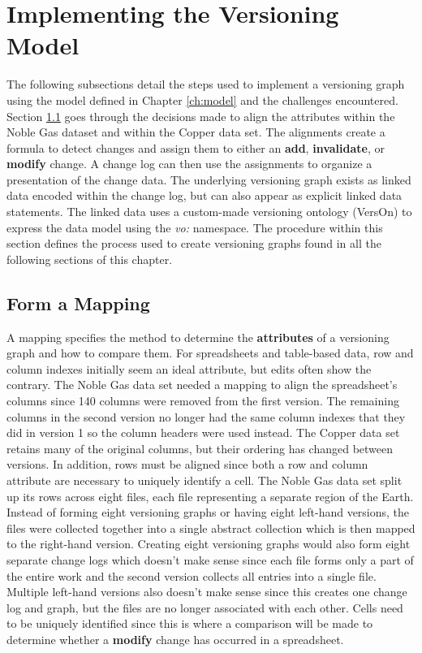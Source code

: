 \section{Implementing the Versioning Model}

The following subsections detail the steps used to implement a versioning graph using the model defined in Chapter \ref{ch:model} and the challenges encountered.
Section \ref{mapping} goes through the decisions made to align the attributes within the Noble Gas dataset and within the Copper data set.
The alignments create a formula to detect changes and assign them to either an \textbf{add}, \textbf{invalidate}, or \textbf{modify} change.
A change log can then use the assignments to organize a presentation of the change data.
The underlying versioning graph exists as linked data encoded within the change log, but can also appear as explicit linked data statements.
The linked data uses a custom-made versioning ontology (VersOn) to express the data model using the \textit{vo:} namespace.
The procedure within this section defines the process used to create versioning graphs found in all the following sections of this chapter.

\subsection{Form a Mapping} \label{mapping}

A mapping specifies the method to determine the \textbf{attributes} of a versioning graph and how to compare them.
For spreadsheets and table-based data, row and column indexes initially seem an ideal attribute, but edits often show the contrary.
The Noble Gas data set needed a mapping to align the spreadsheet's columns since 140 columns were removed from the first version.
The remaining columns in the second version no longer had the same column indexes that they did in version 1 so the column headers were used instead.
The Copper data set retains many of the original columns, but their ordering has changed between versions.
In addition, rows must be aligned since both a row and column attribute are necessary to uniquely identify a cell.
The Noble Gas data set split up its rows across eight files, each file representing a separate region of the Earth.
Instead of forming eight versioning graphs or having eight left-hand versions, the files were collected together into a single abstract collection which is then mapped to the right-hand version.
Creating eight versioning graphs would also form eight separate change logs which doesn't make sense since each file forms only a part of the entire work and the second version collects all entries into a single file.
Multiple left-hand versions also doesn't make sense since this creates one change log and graph, but the files are no longer associated with each other.
Cells need to be uniquely identified since this is where a comparison will be made to determine whether a \textbf{modify} change has occurred in a spreadsheet.

